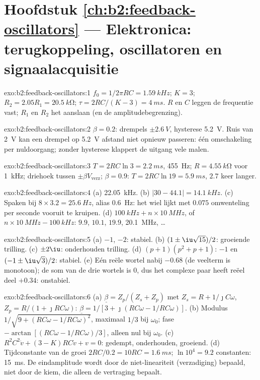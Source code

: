 \section*{Hoofdstuk \ref{ch:b2:feedback-oscillators} --- Elektronica:
terugkoppeling, oscillatoren en signaalacquisitie}

\begin{solution}{exo:b2:feedback-oscillators:1}
$f_0 = 1/2\pi RC = \qty{1.59}{kHz}$; $K = 3$;
$R_2 = 2.05R_1 = \qty{20.5}{k\ohm}$; $\tau = 2RC/(K - 3) = \qty{4}{ms}$. $R$
en $C$ leggen de frequentie vast; $R_1$ en $R_2$ het aanslaan (en de
amplitudebegrenzing).
\end{solution}

\begin{solution}{exo:b2:feedback-oscillators:2}
$\beta = 0.2$: drempels $\pm\qty{2.6}{V}$, hysterese \qty{5.2}{V}. Ruis van
\qty{2}{V} kan een drempel op \qty{5.2}{V} afstand niet opnieuw passeren:
één omschakeling per nuldoorgang; zonder hysterese klappert de uitgang vele
malen.
\end{solution}

\begin{solution}{exo:b2:feedback-oscillators:3}
$T = 2RC\ln3 = \qty{2.2}{ms}$, \qty{455}{Hz}; $R = \qty{4.55}{k\ohm}$ voor
\qty{1}{kHz}; driehoek tussen $\pm\beta V_{\text{verz}}$; $\beta = 0.9$:
$T = 2RC\ln19 = \qty{5.9}{ms}$, $2.7$ keer langer.
\end{solution}

\begin{solution}{exo:b2:feedback-oscillators:4}
(a) \qty{22.05}{kHz}. (b) $|30 - 44.1| = \qty{14.1}{kHz}$. (c) Spaken bij
$8 \times 3.2 =
\qty{25.6}{Hz}$, alias \qty{0.6}{Hz}: het wiel lijkt met
$0.075$ omwenteling per seconde vooruit te kruipen. (d)
$\qty{100}{kHz} + n \times \qty{10}{MHz}$, of
$n \times \qty{10}{MHz} -
\qty{100}{kHz}$: $9.9$, $10.1$, $19.9$,
\qty{20.1}{MHz}, \dots
\end{solution}

\begin{solution}{exo:b2:feedback-oscillators:5}
(a) $-1$, $-2$: stabiel. (b) $(1 \pm \iu\sqrt{15})/2$: groeiende trilling.
(c) $\pm2\iu$: onderhouden trilling. (d) $(p + 1)(p^2 + p + 1)$: $-1$ en
$(-1 \pm \iu\sqrt3)/2$: stabiel. (e) Eén reële wortel nabij $-0.68$ (de
veelterm is monotoon); de som van de drie wortels is $0$, dus het complexe
paar heeft reëel deel $+0.34$: onstabiel.
\end{solution}

\begin{solution}{exo:b2:feedback-oscillators:6}
(a) $\underline\beta = Z_p/(Z_s + Z_p)$ met $Z_s = R + 1/\jmath C\omega$,
$Z_p = R/(1 +
\jmath RC\omega)$:
$\underline\beta = 1/[3 + \jmath(RC\omega - 1/RC\omega)]$. (b) Modulus
$1/\sqrt{9 + (RC\omega - 1/RC\omega)^2}$, maximaal $1/3$ bij $\omega_0$;
fase $-\arctan
[(RC\omega - 1/RC\omega)/3]$, alleen nul bij $\omega_0$. (c)
$R^2C^2\ddot v + (3 - K)RC
\dot v + v = 0$: gedempt, onderhouden, groeiend.
(d) Tijdconstante van de groei $2RC/0.2 = 10RC = \qty{1.6}{ms}$;
$\ln10^4 = 9.2$ constanten: \qty{15}{ms}. De eindamplitude wordt door de
niet-lineariteit (verzadiging) bepaald, niet door de kiem, die alleen de
vertraging bepaalt.
\end{solution}

